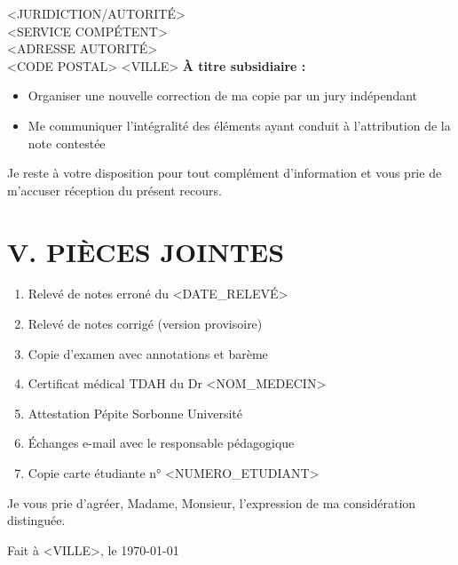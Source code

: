 \documentclass[12pt,french]{scrlttr2}
\begin{document}
\begin{letter}{
<JURIDICTION/AUTORITÉ>\\
<SERVICE COMPÉTENT>\\
<ADRESSE AUTORITÉ>\\
<CODE POSTAL> <VILLE>
}
\textbf{À titre subsidiaire :}
\begin{itemize}
\item Organiser une nouvelle correction de ma copie par un jury indépendant
\item Me communiquer l'intégralité des éléments ayant conduit à l'attribution de la note contestée
\end{itemize}

Je reste à votre disposition pour tout complément d'information et vous prie de m'accuser réception du présent recours.

\section*{V. PIÈCES JOINTES}

\begin{enumerate}
\item Relevé de notes erroné du <DATE_RELEVÉ>
\item Relevé de notes corrigé (version provisoire)
\item Copie d'examen avec annotations et barème
\item Certificat médical TDAH du Dr <NOM_MEDECIN>
\item Attestation Pépite Sorbonne Université
\item Échanges e-mail avec le responsable pédagogique
\item Copie carte étudiante n° <NUMERO_ETUDIANT>
\end{enumerate}

Je vous prie d'agréer, Madame, Monsieur, l'expression de ma considération distinguée.

\closing{Fait à <VILLE>, le \today}

\end{letter}
\end{document}
